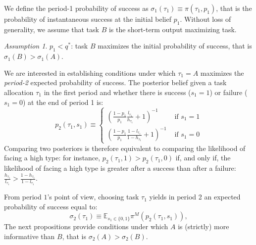 \documentclass[12pt,american]{paper}
\theoremstyle{remark}
\newtheorem{ass}{Assumption}
\begin{document}
We define the period-1 probability of success as  $\sigma_1(\tau_1) \equiv \pi(\tau_1,p_1)$, that is the probability of instantaneous success at the initial belief $p_1$. Without loss of generality, we assume that task $B$ is the short-term output maximizing task.
\begin{ass}\label{ass:sigma1}
$p_1<q^*$: task $B$ maximizes the initial probability of success, that is $\sigma_1(B)>\sigma_1(A)$.
\end{ass}
We are interested in establishing conditions under which $\tau_1=A$ maximizes the \textit{period-2} expected probability of success. The posterior belief given a task allocation $\tau_1$ in the first period and whether there is success ($s_1=1$) or failure ($s_1=0$) at the end of period 1 is:
\[p_2(\tau_1,s_1)\equiv \begin{cases} 
\left(\frac{1-p_1}{p_1}\frac{l_{\tau_1}}{h_{\tau_1}}+1\right)^{-1} &\mbox{ if } s_1=1\\
\left(\frac{1-p_1}{p_1}\frac{1-l_{\tau_1}}{1-h_{\tau_1}}+1\right)^{-1} &\mbox{ if } s_1=0
\end{cases}
\]
Comparing two posteriors is therefore equivalent to comparing the likelihood of facing a high type: for instance, $p_2(\tau_1,1)>p_2(\tau_1,0)$ if, and only if, the likelihood of facing a high type is greater after a success than after a failure: $\frac{h_{\tau_1}}{l_{\tau_1}}>\frac{1-h_{\tau_1}}{1-l_{\tau_1}}$. 

From period $1$'s point of view, choosing task $\tau_1$ yields in period 2 an expected probability of success equal to: 
\begin{equation*}
\sigma_2(\tau_1) \equiv \mathbb E_{s_1\in\{0,1\}}\pi^M (p_2(\tau_1,s_1)),
\end{equation*}
The next propositions provide conditions under which $A$ is (strictly) more informative than $B$, that is  $\sigma_2(A)>\sigma_2(B)$. 
\end{document}
